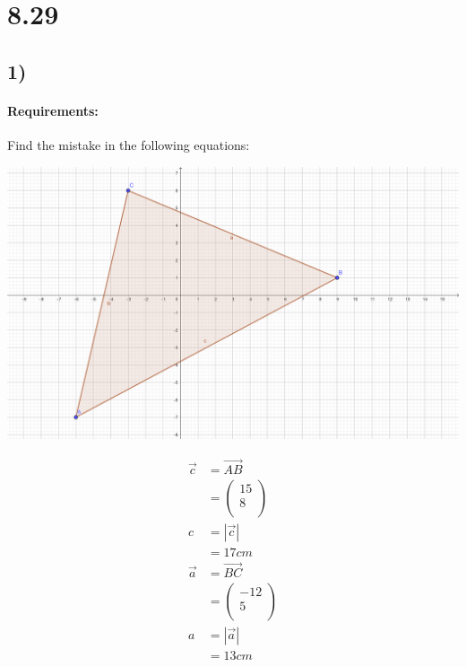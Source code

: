 \section{8.29}
\subsection{1)}
\paragraph{Requirements:}
Find the mistake in the following equations:

\def\AB{\begin{pmatrix}
    15 \\
    8 \\
\end{pmatrix}}

\def\BC{\begin{pmatrix}
    -12 \\
    5 \\
\end{pmatrix}}

\def\cosval{-0.633...}
\def\cosang{129.31}
\def\cosanginv{\pgfmathparse{180 - \cosang}\pgfmathresult}
\def\sinofang{\pgfmathparse{sin(\cosang)}\pgfmathresult}
\def\sinofanginv{\pgfmathparse{sin(180 - \cosang)}\pgfmathresult}

\includegraphics[width=\linewidth]{images/8-29-1.png}

\begin{align}
    \vec{c} &= \vec{AB} \\ 
    &= \AB \\
    c &= |\vec{c}|  \\
    &= 17cm \\[20pt]
    \vec{a} &= \vec{BC} \\
    &= \BC \\
    a &= |\vec{a}| \\
    &= 13cm \\[20pt]
\end{align}

